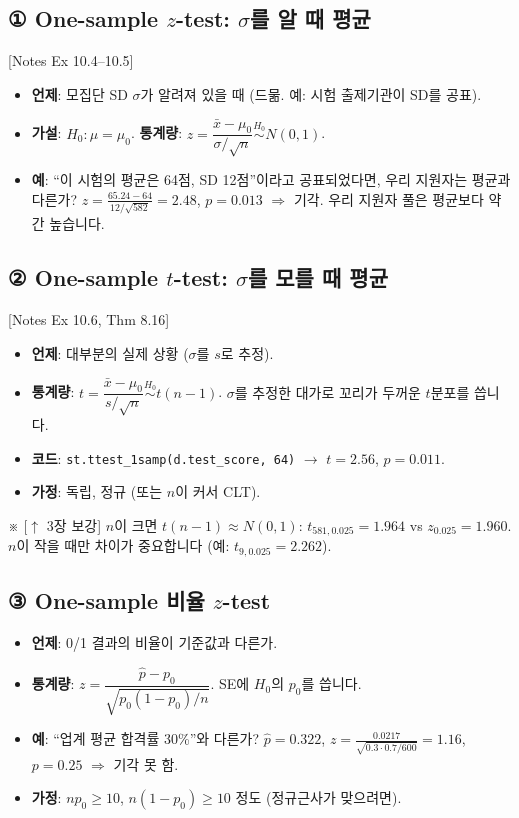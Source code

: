 \documentclass[11pt,a4paper]{article}
\newcommand{\code}[1]{\texttt{#1}}
\newcommand{\nref}[1]{{\footnotesize\textsf{\color{blue!55!black}[Notes #1]}}}
\newcommand{\aside}[1]{{\footnotesize\color{black!65}#1}}
\newcommand{\linkup}[1]{{\footnotesize\textsf{\color{green!40!black}[$\uparrow$ #1 보강]}}}
\begin{document}
\subsection*{① One-sample $z$-test: $\sigma$를 알 때 평균} \nref{Ex 10.4–10.5}
\begin{itemize}
\item \textbf{언제}: 모집단 SD $\sigma$가 알려져 있을 때 (드묾. 예: 시험 출제기관이 SD를 공표).
\item \textbf{가설}: $H_0:\mu=\mu_0$. \quad \textbf{통계량}: $z=\dfrac{\bar x-\mu_0}{\sigma/\sqrt n}\overset{H_0}\sim N(0,1)$.
\item \textbf{예}: ``이 시험의 평균은 64점, SD 12점''이라고 공표되었다면, 우리 지원자는 평균과 다른가? $z=\frac{65.24-64}{12/\sqrt{582}}=2.48$, $p=0.013$ $\Rightarrow$ 기각. 우리 지원자 풀은 평균보다 약간 높습니다.
\end{itemize}

\subsection*{② One-sample $t$-test: $\sigma$를 모를 때 평균} \nref{Ex 10.6, Thm 8.16}
\begin{itemize}
\item \textbf{언제}: 대부분의 실제 상황 ($\sigma$를 $s$로 추정).
\item \textbf{통계량}: $t=\dfrac{\bar x-\mu_0}{s/\sqrt n}\overset{H_0}\sim t(n-1)$. \aside{$\sigma$를 추정한 대가로 꼬리가 두꺼운 $t$분포를 씁니다.}
\item \textbf{코드}: \code{st.ttest\_1samp(d.test\_score, 64)} $\to$ $t=2.56$, $p=0.011$.
\item \textbf{가정}: 독립, 정규 (또는 $n$이 커서 CLT).
\end{itemize}
\aside{※ \linkup{3장} $n$이 크면 $t(n-1)\approx N(0,1)$: $t_{581,0.025}=1.964$ vs $z_{0.025}=1.960$. $n$이 작을 때만 차이가 중요합니다 (예: $t_{9,0.025}=2.262$).}

\subsection*{③ One-sample 비율 $z$-test}
\begin{itemize}
\item \textbf{언제}: 0/1 결과의 비율이 기준값과 다른가.
\item \textbf{통계량}: $z=\dfrac{\hat p-p_0}{\sqrt{p_0(1-p_0)/n}}$. \aside{SE에 $H_0$의 $p_0$를 씁니다.}
\item \textbf{예}: ``업계 평균 합격률 30\%''와 다른가? $\hat p=0.322$, $z=\frac{0.0217}{\sqrt{0.3\cdot0.7/600}}=1.16$, $p=0.25$ $\Rightarrow$ 기각 못 함.
\item \textbf{가정}: $np_0\ge10$, $n(1-p_0)\ge10$ 정도 (정규근사가 맞으려면).
\end{itemize}
\end{document}
